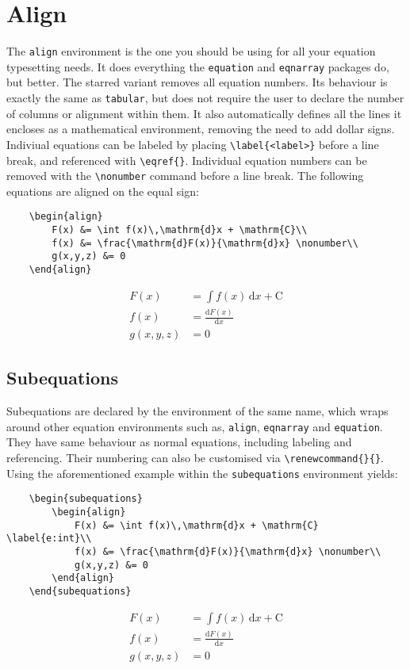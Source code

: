 \section{Align}
%
The \verb|align| environment is the one you should be using for all
your equation typesetting needs.  It does everything the
\verb|equation| and \verb|eqnarray| packages do, but better.  The
starred variant removes all equation numbers.  Its behaviour is
exactly the same as \verb|tabular|, but does not require the user to
declare the number of columns or alignment within them.  It also
automatically defines all the lines it encloses as a mathematical
environment, removing the need to add dollar signs.  Indiviual
equations can be labeled by placing \verb|\label{<label>}| before a
line break, and referenced with \verb|\eqref{}|.  Individual equation
numbers can be removed with the \verb|\nonumber| command before a line
break.  The following equations are aligned on the equal sign:
\begin{verbatim}
	\begin{align}
	    F(x) &= \int f(x)\,\mathrm{d}x + \mathrm{C}\\
	    f(x) &= \frac{\mathrm{d}F(x)}{\mathrm{d}x} \nonumber\\
	    g(x,y,z) &= 0
	\end{align}
\end{verbatim}
\begin{align}
    F(x) &= \int f(x)\,\mathrm{d}x + \mathrm{C}\\
    f(x) &= \frac{\mathrm{d}F(x)}{\mathrm{d}x} \nonumber\\
    g(x,y,z) &= 0
\end{align}
%
\subsection{Subequations}
%
Subequations are declared by the environment of the same name, which
wraps around other equation environments such as, \verb|align|,
\verb|eqnarray| and \verb|equation|.  They have same behaviour as
normal equations, including labeling and referencing.  Their numbering
can also be customised via \verb|\renewcommand{}{}|.  Using the
aforementioned example within the \verb|subequations| environment
yields:
\begin{verbatim}
	\begin{subequations}
	    \begin{align}
	        F(x) &= \int f(x)\,\mathrm{d}x + \mathrm{C} \label{e:int}\\
	        f(x) &= \frac{\mathrm{d}F(x)}{\mathrm{d}x} \nonumber\\
	        g(x,y,z) &= 0
	    \end{align}
	\end{subequations}
\end{verbatim}
\begin{subequations}
	\begin{align}
        F(x) &= \int f(x)\,\mathrm{d}x + \mathrm{C} \label{e:int}\\
        f(x) &= \frac{\mathrm{d}F(x)}{\mathrm{d}x} \nonumber\\
        g(x,y,z) &= 0
    \end{align}
\end{subequations}
%
